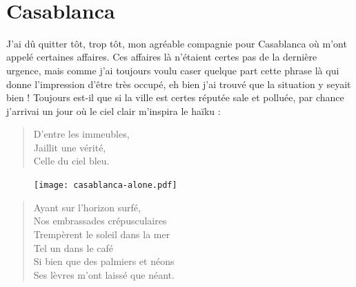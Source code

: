 \newpage{}
\thispagestyle{empty}
~
\vfill
\pagebreak


\section*{Casablanca}


\begin{prose}
  J’ai dû quitter tôt, trop tôt, mon agréable compagnie pour Casablanca où m’ont appelé certaines affaires. Ces affaires là n’étaient certes pas de la dernière urgence, mais comme j’ai toujours voulu caser quelque part cette phrase là qui donne l’impression d’être très occupé, eh bien j’ai trouvé que la situation y seyait bien ! Toujours est-il que si la ville est certes réputée sale et polluée, par chance j’arrivai un jour où le ciel clair m’inspira le haïku :
\end{prose}

\begin{verse}\haiku
  D’entre les immeubles,\\  %
  Jaillit une vérité,\\  %
  Celle du ciel bleu.
\end{verse}

\begin{figure}[h]
  \centering
  \texttt{[image: casablanca-alone.pdf]}
  \captionsetup{labelformat=empty}
  \caption[Idéotexte de  (\textarabic{البيضاء})]{}
\end{figure}

\begin{verse}\sizain
  Ayant sur l’horizon surfé,\\ 
  Nos embrassades crépusculaires\\ 
  Trempèrent  le soleil dans la mer\\ 
  Tel un  dans le café\\ 
  Si bien que des palmiers et néons\\ 
  Ses lèvres m’ont laissé que néant.  %
\end{verse}

